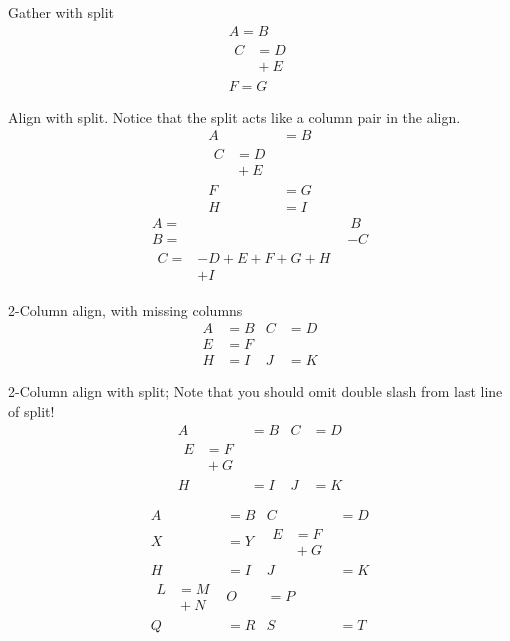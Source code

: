 \documentclass[a4paper]{book}
\begin{document}
Gather with split
\begin{gather}
A = B \\
\begin{split}
C &= D \\
&{}+E
\end{split}\\
 F = G
\end{gather}

Align with split.
Notice that the split acts like a column pair in the align.
\begin{align}
A &= B \\
\begin{split}
C &= D \\
&{}+E
\end{split}\\
 F &= G\\
H &= I
\end{align}
\begin{align}
A =&\ B \\
B=& - C \\
\begin{split}
C =& -D + E + F + G + H\\
&+I
\end{split}
\end{align}

2-Column align, with missing columns
\begin{align}
  A &= B &
 C &= D \\
  E &= F \\
  H &=  I &
  J &= K
\end{align}

2-Column align with split;
Note that you should omit double slash from last line of split!
\begin{align}
  A &= B &
 C &= D \\
\begin{split}
  E &= F \\
    &{} + G
\end{split}\\
  H &=  I &
  J &= K
\end{align}

\begin{align}
  A &= B &
  C &= D \\
  X &= Y &
\begin{split}
  E &= F \\
    &{} + G
\end{split}\\
  H &=  I & J &= K \\
  \begin{split}
    L &= M\\
    &{}+N
  \end{split} &
 O &= P\\
  Q &= R &
  S &= T
\end{align}
\end{document}
